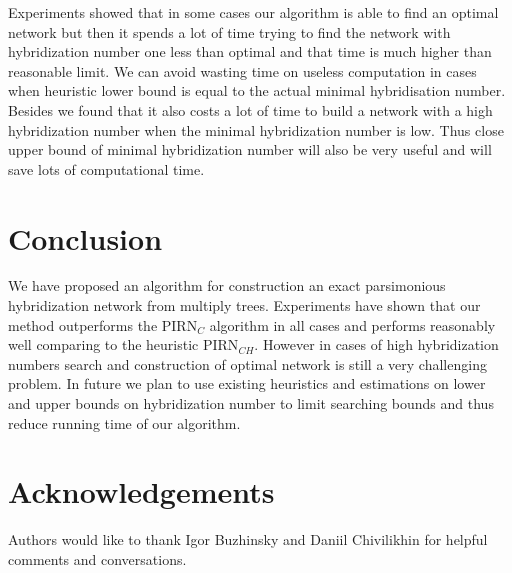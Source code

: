 \documentclass[runningheads, envcountsame, a4paper]{llncs}
\begin{document}
Experiments showed that in some cases our algorithm is able to find an optimal network but then it spends a lot of time trying to find the network 
with hybridization number one less than optimal and that time is much higher than reasonable limit. We can avoid wasting time on useless computation 
in cases when heuristic lower bound is equal to the actual minimal hybridisation number. Besides we found 
that it also costs a lot of time to build a network with a high hybridization number when the minimal hybridization number is low. 
Thus close upper bound of minimal hybridization number will also be very useful and will save lots of computational time.

\section{Conclusion}

We have proposed an algorithm for construction an exact parsimonious hybridization network from multiply trees. Experiments have shown that our method 
outperforms the PIRN$_{C}$ algorithm in all cases and performs reasonably well comparing to the heuristic PIRN$_{CH}$. However in cases of high 
hybridization numbers search and construction of optimal network is still a very challenging problem. In future we plan to use existing 
heuristics and estimations on lower and upper bounds on hybridization number to limit searching bounds and thus reduce running time of our algorithm.

\section*{Acknowledgements}

Authors would like to thank Igor Buzhinsky and Daniil Chivilikhin for helpful comments and conversations.



\clearpage
\end{document}

